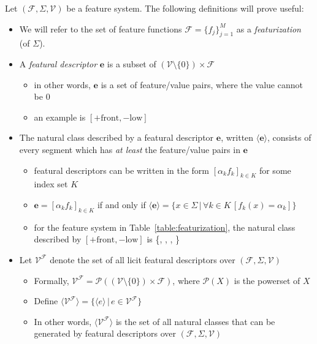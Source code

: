 \documentclass[11pt, oneside]{article}   	%
\begin{document}
\vspace{\baselineskip} \noindent Let $(\mathcal F, \Sigma, \mathcal V)$ be a feature system. The following definitions will prove useful: \begin{itemize}
    \item We will refer to the set of feature functions $\mathcal F = \{f_j\}_{j=1}^M$ as a \textit{featurization} (of $\Sigma$). 
    \item A \textit{featural descriptor} $\mathbf{e}$ is a subset of $(\mathcal V \setminus \{0\}) \times \mathcal F$ \begin{itemize}
        \item in other words, $\mathbf{e}$ is a set of feature/value pairs, where the value cannot be $0$
        \item an example is $[+ \text{front}, - \text{low}]$
        \end{itemize}
    \item The natural class described by a featural descriptor $\mathbf{e}$, written $\langle \mathbf{e} \rangle$, consists of every segment which has \textit{at least} the feature/value pairs in $\mathbf{e}$ \begin{itemize}
        \item featural descriptors can be written in the form $[\alpha_k f_k]_{k \in K}$ for some index set $K$
        \item $\mathbf{e} = [\alpha_k f_k]_{k \in K}$ if and only if $\langle \mathbf{e} \rangle = \{x \in \Sigma \, | \, \forall k \in K \, [ f_k(x) = \alpha_k ] \}$
        \item for the feature system in Table~\ref{table:featurization}, the natural class described by $[+ \text{front}, - \text{low}]$ is \{, , , \textipa{\oe}\}
        \end{itemize}
    \item Let $\mathcal V^\mathcal F$ denote the set of all licit featural descriptors over $(\mathcal F, \Sigma, \mathcal V)$ \begin{itemize}
        \item Formally, $\mathcal V^\mathcal F = \mathcal P((\mathcal V \setminus \{0\}) \times \mathcal F)$, where $\mathcal P(X)$ is the powerset of $X$
        \item Define $\langle \mathcal V^\mathcal F \rangle = \{ \langle e \rangle \, | \, e \in \mathcal V^\mathcal F \}$
        \item In other words, $\langle \mathcal V^\mathcal F \rangle$ is the set of all natural classes that can be generated by featural descriptors over $(\mathcal F, \Sigma, \mathcal V)$
        \end{itemize}
    \end {itemize}
    
\end{document}
